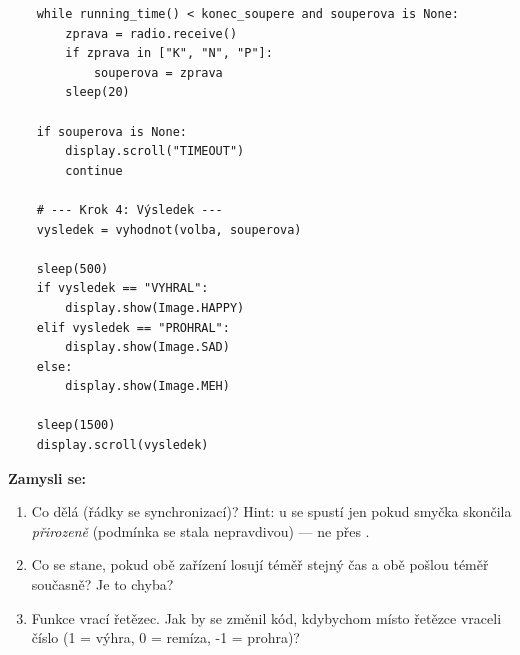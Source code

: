 \begin{bonusukol}
\begin{lstlisting}
    while running_time() < konec_soupere and souperova is None:
        zprava = radio.receive()
        if zprava in ["K", "N", "P"]:
            souperova = zprava
        sleep(20)

    if souperova is None:
        display.scroll("TIMEOUT")
        continue

    # --- Krok 4: Výsledek ---
    vysledek = vyhodnot(volba, souperova)

    sleep(500)
    if vysledek == "VYHRAL":
        display.show(Image.HAPPY)
    elif vysledek == "PROHRAL":
        display.show(Image.SAD)
    else:
        display.show(Image.MEH)

    sleep(1500)
    display.scroll(vysledek)
\end{lstlisting}

\textbf{Zamysli se:}
\begin{enumerate}
  \item Co dělá  (řádky se synchronizací)?
        Hint:  u  se spustí jen pokud smyčka
        skončila \emph{přirozeně} (podmínka se stala nepravdivou) — ne přes .

  \item Co se stane, pokud obě zařízení losují téměř stejný čas a obě pošlou 
        téměř současně? Je to chyba?

  \item Funkce  vrací řetězec. Jak by se změnil kód,
        kdybychom místo řetězce vraceli číslo (1 = výhra, 0 = remíza, -1 = prohra)?
\end{enumerate}

\odpoved[3cm]

\end{bonusukol}


